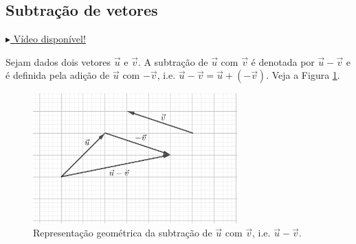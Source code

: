 \subsection{Subtração de vetores}

\begin{flushright}
  \href{https://archive.org/details/subtracao-de-vetores}{$\blacktriangleright$ Vídeo disponível!}
\end{flushright}

Sejam dados dois vetores $\vec{u}$ e $\vec{v}$. A subtração de $\vec{u}$ com $\vec{v}$ é denotada por $\vec{u}-\vec{v}$ e é definida pela adição de $\vec{u}$ com $-\vec{v}$, i.e. $\vec{u}-\vec{v}=\vec{u}+(-\vec{v})$. Veja a Figura \ref{fig:vsubtracao}.

\begin{figure}[H]
  \centering
  \includegraphics[width=0.7\textwidth]{./cap_vetor/dados/fig_vsubtracao/fig_vsubtracao}
  \caption{Representação geométrica da subtração de $\vec{u}$ com $\vec{v}$, i.e. $\vec{u}-\vec{v}$.}
  \label{fig:vsubtracao}
\end{figure}

